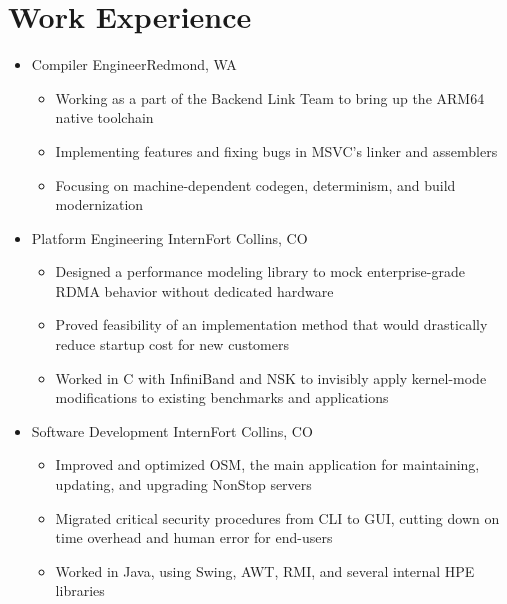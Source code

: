 \documentclass[10pt,letterpaper,sans]{moderncv}
\renewcommand{\_}{\textscale{.7}{\textunderscore}}
\newcommand{\+}{%
  \raisebox{\dimexpr(\fontcharht\font`X-\height+\depth)/2\relax}{+}%
}
\begin{document}
\section{Work Experience}
\begin{itemize}
\item{
  {Compiler Engineer}{Redmond, WA}{}{
    \begin{itemize}
    \item Working as a part of the Backend Link Team to bring up the ARM64 native toolchain
    \item Implementing features and fixing bugs in MSVC's linker and assemblers
    \item Focusing on machine-dependent codegen, determinism, and build modernization
    \end{itemize}
}}
\item{
  {Platform Engineering Intern}{Fort Collins, CO}{}{
    \begin{itemize}
    \item Designed a performance modeling library to mock enterprise-grade RDMA behavior without dedicated hardware
    \item Proved feasibility of an implementation method that would drastically reduce startup cost for new customers
    \item Worked in C with InfiniBand and NSK to invisibly apply kernel-mode modifications to existing benchmarks and applications
    \end{itemize}
}}
\item{
  {Software Development Intern}{Fort Collins, CO}{}{
    \begin{itemize}
    \item Improved and optimized OSM, the main application for maintaining, updating,
      and upgrading NonStop servers
    \item Migrated critical security procedures from CLI to GUI, cutting down on time
      overhead and human error for end-users
    \item Worked in Java, using Swing, AWT, RMI, and several internal HPE libraries
    \end{itemize}
}}
\end{itemize}
\end{document}
